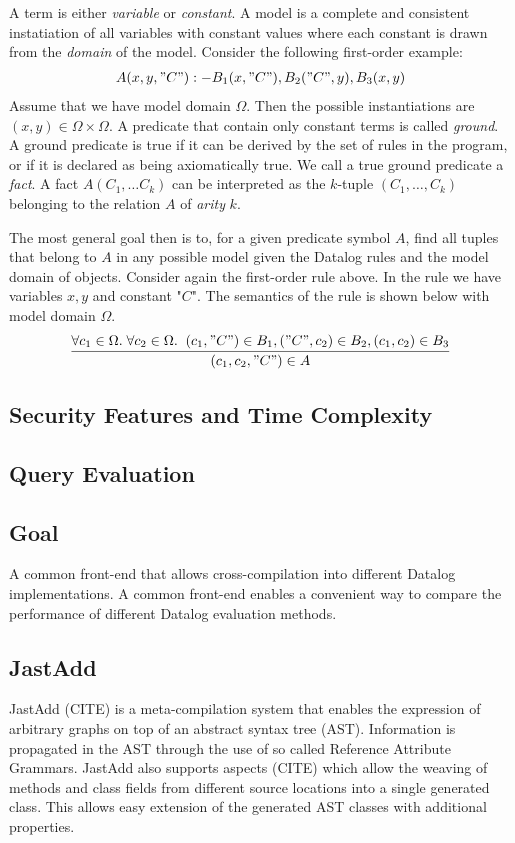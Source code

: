 \NL
A term is either \textit{variable} or \textit{constant}. 
A model is a complete and consistent instatiation of all variables with constant values where each constant is drawn from the \textit{domain} of the model. Consider the following first-order example:
\begin{align*}
A(x, y, "C") :- B_1(x, "C"), B_2("C", y), B_3(x, y)
\end{align*}
Assume that we have model domain $\Omega$. Then the possible instantiations are $(x,y) \in \Omega \times \Omega$. A predicate that contain only constant terms is called \textit{ground}. A ground predicate is true if it can be derived by the set of rules in the program, or if it is declared as being axiomatically true. We call a true ground predicate a \textit{fact}. A fact $A(C_1, \ldots C_k)$ can be interpreted as the $k$-tuple $(C_1, \ldots, C_k)$ belonging to the relation $A$ of \textit{arity} $k$.

\NL
The most general goal then is to, for a given predicate symbol $A$, find all tuples that belong to $A$ in any possible model given the Datalog rules and the model domain of objects. Consider again the first-order rule above. In the rule we have variables $x,y$ and constant "$C$". The semantics of the rule is shown below with model domain $\Omega$.
\begin{align*}
\infer{(c_1, c_2, "C") \in A}{%
	\forall c_1 \in \Omega.\;\forall c_2 \in \Omega. \;\; (c_1, "C") \in B_1, ("C", c_2) \in B_2, (c_1,c_2) \in B_3
}
\end{align*}

\subsection{Security Features and Time Complexity}

\subsection{Query Evaluation}

\subsection{Goal}
A common front-end that allows cross-compilation into different Datalog implementations. A common front-end enables a convenient way to compare the performance of different Datalog evaluation methods.

\subsection{JastAdd}
JastAdd (CITE) is a meta-compilation system that enables the expression of arbitrary graphs on top of an abstract syntax tree (AST). Information is propagated in the AST through the use of so called Reference Attribute Grammars. JastAdd also supports aspects (CITE) which allow the weaving of methods and class fields from different source locations into a single generated class. This allows easy extension of the generated AST classes with additional properties.

